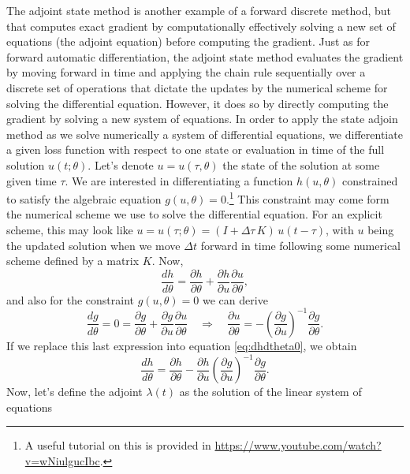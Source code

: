 The adjoint state method is another example of a forward discrete method, but that computes exact gradient by computationally effectively solving a new set of equations (the adjoint equation) before computing the gradient.
Just as for forward automatic differentiation, the adjoint state method evaluates the gradient by moving forward in time and applying the chain rule sequentially over a discrete set of operations that dictate the updates by the numerical scheme for solving the differential equation. However, it does so by directly computing the gradient by solving a new system of equations.
In order to apply the state adjoin method as we solve numerically a system of differential equations, we differentiate
a given loss function with respect to one state or evaluation in time of the full solution $u(t;\theta)$. Let's denote $u = u(\tau, \theta)$ the state of the solution at some given time $\tau$. We are interested in differentiating a function $h(u, \theta)$ constrained to satisfy the algebraic equation $g(u, \theta)=0$.\footnote{A useful tutorial on this is provided in \url{https://www.youtube.com/watch?v=wNiulgucIbc}.}
This constraint may come form the numerical scheme we use to solve the differential equation. For an explicit scheme, this may look like $u = u(\tau; \theta) = (I + \Delta \tau \, K) \, u(t - \tau)$, with $u$ being the updated solution when we move $\Delta t$ forward in time following some numerical scheme defined by a matrix $K$. Now,
\begin{equation}
 \frac{dh}{d\theta} = \frac{\partial h}{\partial \theta} + \frac{\partial h }{\partial u} \frac{\partial u}{\partial \theta},
 \label{eq:dhdtheta0}
\end{equation}
and also for the constraint $g(u, \theta)=0$ we can derive
\begin{equation}
 \frac{dg}{d\theta} = 0 = \frac{\partial g}{\partial \theta} + \frac{\partial g}{\partial u} \frac{\partial u}{\partial \theta}
 \quad \Rightarrow \quad
 \frac{\partial u}{\partial \theta} = - \left( \frac{\partial g}{\partial u} \right)^{-1} \frac{\partial g}{\partial \theta}.
\end{equation}
If we replace this last expression into equation \eqref{eq:dhdtheta0}, we obtain
\begin{equation}
 \frac{dh}{d\theta} 
 =
 \frac{\partial h}{\partial \theta} - \frac{\partial h}{\partial u} \left( \frac{\partial g}{\partial u} \right)^{-1} \frac{\partial g}{\partial \theta}.
    \label{eq:dhdtheta}
\end{equation}
Now, let's define the adjoint $\lambda(t)$ as the solution of the linear system of equations 
